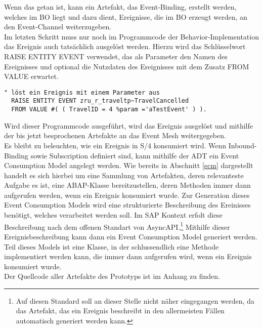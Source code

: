 Wenn das getan ist, kann ein Artefakt, das Event-Binding, erstellt werden, welches im \ac{BO} liegt und dazu dient, Ereignisse, die im \ac{BO} erzeugt werden, an den Event-Channel weiterzugeben.\\
Im letzten Schritt muss nur noch im Programmcode der Behavior-Implementation das Ereignis auch tatsächlich ausgelöst werden. Hierzu wird das Schlüsselwort RAISE ENTITY EVENT verwendet, das als Parameter den Namen des Ereignisses und optional die Nutzdaten des Ereignisses mit dem Zusatz FROM VALUE erwartet.\\

\begin{lstlisting}[language=ABAP]
  " löst ein Ereignis mit einem Parameter aus
  RAISE ENTITY EVENT zru_r_traveltp~TravelCancelled
  FROM VALUE #( ( TravelID = 4 %param ='aTestEvent' ) ).
\end{lstlisting}

Wird dieser Programmcode ausgeführt, wird das Ereignis ausgelöst und mithilfe der bis jetzt besprochenen Artefakte an das Event Mesh weitergegeben.\\

Es bleibt zu beleuchten, wie ein Ereignis in S/4 konsumiert wird. Wenn Inbound-Binding sowie Subscription definiert sind, kann mithilfe der \ac{ADT} ein Event Consumption Model angelegt werden. Wie bereits in Abschnitt \ref{ecm} dargestellt handelt es sich hierbei um eine Sammlung von Artefakten, deren relevanteste Aufgabe es ist, eine \ac{ABAP}-Klasse bereitzustellen, deren Methoden immer dann aufgerufen werden, wenn ein Ereignis konsumiert wurde. Zur Generation dieses Event Consumption Models wird eine strukturierte Beschreibung des Ereinisses benötigt, welches verarbeitet werden soll. Im SAP Kontext erfolt diese Beschreibung nach dem offenen Standart von AsyncAPI.\footnote{Auf diesen Standard soll an dieser Stelle nicht näher eingegangen werden, da das Artefakt, das ein Ereignis beschreibt in den allermeisten Fällen automatisch generiert werden kann.} Mithilfe dieser Ereignisbeschreibung kann dann ein Event Consumption Model generiert werden. Teil dieses Models ist eine Klasse, in der schlussendlich eine Methode implementiert werden kann, die immer dann aufgerufen wird, wenn ein Ereignis konsumiert wurde.\\ Der Quellcode aller Artefakte des Prototyps ist im Anhang zu finden.\\


